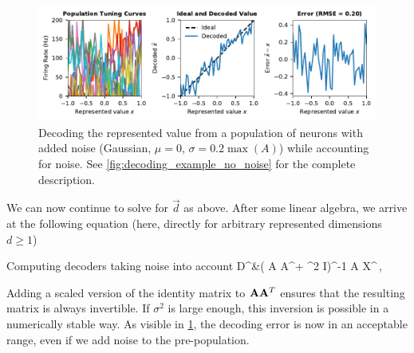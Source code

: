 \documentclass[10pt,letterpaper,oneside]{article}
\begin{document}
\begin{figure}
	\centering
	\includegraphics{media/decoding_example_noise_accounted.pdf}
	\caption{Decoding the represented value from a population of neurons with added noise (Gaussian, $\mu = 0$, $\sigma = 0.2 \max(A)$) while accounting for noise. See \cref{fig:decoding_example_no_noise} for the complete description. }
	\label{fig:decoding_example_noise_accounted}
\end{figure}

We can now continue to solve for $\vec{d}$ as above. After some linear algebra, we arrive at the following equation (here, directly for arbitrary represented dimensions $d \geq 1$)
\begin{ImportantEqn}{Computing decoders taking noise into account}
	\mat D^\T &\approx  \left( \mat A \mat A^\T + \sigma^2 \mat I\right)^{-1} \mat A \mat X^\T \,, 
	\label{eqn:decoders_noise}
\end{ImportantEqn}
Adding a scaled version of the identity matrix to ${\mathbf{A}} {\mathbf{A}}^T$ ensures that the resulting matrix is always invertible. If $\sigma^2$ is large enough, this inversion is possible in a numerically stable way. As visible in \cref{fig:decoding_example_noise_accounted}, the decoding error is now in an acceptable range, even if we add noise to the pre-population.

\cprotect{}


%
%
%

\printbibliography
\end{document}
